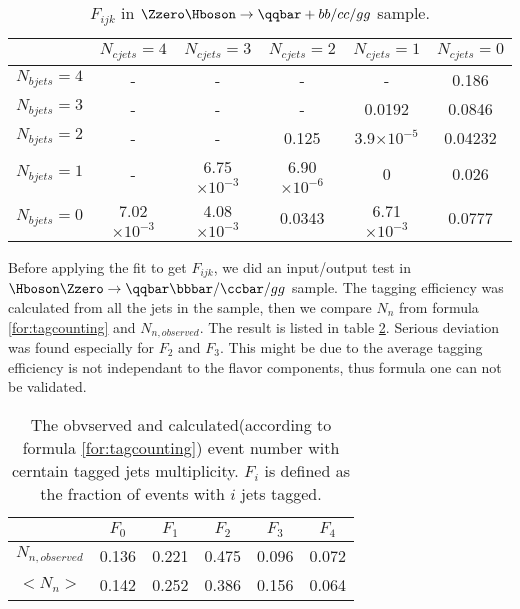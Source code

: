 \begin{table}[!htpb]
\centering
\begin{tabular}{|c|c|c|c|c|c|}\hline
               & $N_{cjets}=4$ & $N_{cjets}=3$ & $N_{cjets}=2$ & $N_{cjets}=1$ & $N_{cjets}=0$ \\ \hline 
 $N_{bjets}=4$ &    -          &      -        &      -        &      -        &   0.186  \\ \hline
 $N_{bjets}=3$ &    -          &      -        &      -        &     0.0192    &   0.0846 \\ \hline
 $N_{bjets}=2$ &    -          &      -        &     0.125     &3.9$\times10^{-5}$& 0.04232 \\ \hline
 $N_{bjets}=1$ &    -          & 6.75$\times10^{-3}$&6.90$\times10^{-6}$& 0    &   0.026  \\ \hline
 $N_{bjets}=0$ &7.02$\times10^{-3}$&4.08$\times10^{-3}$&0.0343 &6.71$\times10^{-3}$ & 0.0777\\ \hline   

\end{tabular}
 \caption{$F_{ijk}$ in $\Zzero\Hboson\to \qqbar + bb/cc/gg$ sample.}
 \label{tab:fijk}
\end{table}

Before applying the fit to get $F_{ijk}$, we did an input/output test in $\Hboson\Zzero\to \qqbar \bbbar/\ccbar/gg$ sample. The tagging efficiency was calculated from all the jets in the sample, then we compare $N_n$ from formula \ref{for:tagcounting} and $N_{n,observed}$. The result is listed in table \ref{tab:tagcounting_io}. Serious deviation was found especially for $F_2$ and $F_3$. This might be due to the average tagging efficiency is not independant to the flavor components, thus formula one can not be validated. 
\begin{table}
\centering
\begin{tabular}{|c|c|c|c|c|c|}\hline
            &   $F_0$     &    $F_1$     &   $F_2$      &    $F_3$       &    $F_4$    \\ \hline
$N_{n,observed}$       
            &    0.136    &   0.221      &   0.475      &     0.096      &     0.072   \\ \hline
$<N_n>$     &    0.142    &   0.252      &   0.386      &     0.156      &     0.064   \\ \hline              
\end{tabular}
\caption{The obvserved and calculated(according to formula \ref{for:tagcounting}) event number with cerntain tagged jets multiplicity. $F_i$ is defined as the fraction of events with $i$ jets tagged.}
\label{tab:tagcounting_io}
\end{table}
\clearpage